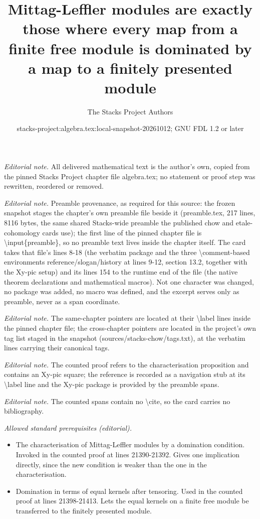 \documentclass[10pt,a4paper]{amsart}
\title{Mittag-Leffler modules are exactly those where every map from a finite free module is dominated by a map to a finitely presented module}
\author{The Stacks Project Authors}
\date{stacks-project:algebra.tex:local-snapshot-20261012; GNU FDL 1.2 or later}
\theoremstyle{plain}
\theoremstyle{definition}
\theoremstyle{remark}
\numberwithin{equation}{subsection}
\begin{document}
\maketitle
\noindent\textit{Editorial note.} All delivered mathematical text is the author's own, copied from the pinned Stacks Project chapter file algebra.tex; no statement or proof step was rewritten, reordered or removed.\par\medskip
\noindent\textit{Editorial note.} Preamble provenance, as required for this source: the frozen snapshot stages the chapter's own preamble file beside it (preamble.tex, 217 lines, 8116 bytes, the same shared Stacks-wide preamble the published chow and etale-cohomology cards use); the first line of the pinned chapter file is \textbackslash{}input\{preamble\}, so no preamble text lives inside the chapter itself. The card takes that file's lines 8-18 (the verbatim package and the three \textbackslash{}comment-based environments reference/slogan/history at lines 9-12, section 13.2, together with the Xy-pic setup) and its lines 154 to the runtime end of the file (the native theorem declarations and mathematical macros). Not one character was changed, no package was added, no macro was defined, and the excerpt serves only as preamble, never as a span coordinate.\par\medskip
\noindent\textit{Editorial note.} The same-chapter pointers are located at their \textbackslash{}label lines inside the pinned chapter file; the cross-chapter pointers are located in the project's own tag list staged in the snapshot (sources/stacks-chow/tags.txt), at the verbatim lines carrying their canonical tags.\par\medskip
\noindent\textit{Editorial note.} The counted proof refers to the characterisation proposition and contains an Xy-pic square; the reference is recorded as a navigation stub at its \textbackslash{}label line and the Xy-pic package is provided by the preamble spans.\par\medskip
\noindent\textit{Editorial note.} The counted spans contain no \textbackslash{}cite, so the card carries no bibliography.\par\medskip
\noindent\textit{Allowed standard prerequisites (editorial).}\begin{itemize}
\item The characterisation of Mittag-Leffler modules by a domination condition. Invoked in the counted proof at lines 21390-21392. Gives one implication directly, since the new condition is weaker than the one in the characterisation.
\item Domination in terms of equal kernels after tensoring. Used in the counted proof at lines 21398-21413. Lets the equal kernels on a finite free module be transferred to the finitely presented module.
\end{itemize}\medskip
\end{document}
